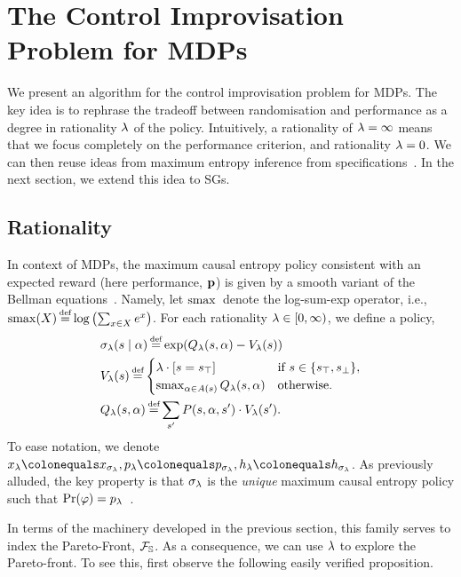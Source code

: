 
\section{The Control Improvisation Problem for MDPs}
\label{sec:mdps}

We present an algorithm for the control improvisation problem for
MDPs. The key idea is to rephrase the tradeoff between
randomisation and performance as a degree in rationality $\lambda$ of the
policy. Intuitively, a rationality of $\lambda = \infty$ means that we
focus completely on the performance criterion, and rationality $\lambda =
0$. We can then reuse ideas from maximum entropy inference from
specifications~\cite{DBLP:conf/cav/Vazquez-Chanlatte20}.  In the next
section, we extend this idea to SGs.

\subsection{Rationality}

\noindent
In context of MDPs, the maximum causal entropy policy consistent with
an expected reward (here performance, $\mathbf{p}$) is given by a
smooth variant of the Bellman equations~\cite{mceThesis}. Namely, let
$\operatorname*{\mathrm{smax}}{}$ denote the log-sum-exp operator, i.e., $\smoothmax(X)
\eqdef \log \left( \sum_{x\in X} e^x \right)$. For each rationality
$\lambda \in [0, \infty)$, we define a policy,
 \begin{align}
   &\sched_\rat(s\mid \act) \eqdef \exp( Q_\rat(s,\act) - V_\rat(s))  \\
   & V_\rat(s) \eqdef  \begin{cases}
     \lambda  \cdot \indicator{s = \target} & \text{if }s \in \{ \target, \sink \},\\
     \smoothmax_{\act \in \EnAct(s)}{  Q_\rat(s,\act) } & \text{otherwise.}
   \end{cases}\\ 
	& Q_\rat(s, \act) \eqdef \sum_{s'} P(s,\act,s') \cdot V_\rat(s').
 \end{align}
To ease notation, we denote $x_\rat \colonequals x_{\sched_\rat},
\scp_\rat \colonequals \scp_{\sched_\rat}, \rndp_\rat \colonequals
\rndp_{\sched_\rat}$. As previously alluded, the key property
is that $\sigma_\lambda$ is the \emph{unique} maximum causal entropy policy
such that $\Pr(\varphi) = p_\lambda$~\cite{DBLP:conf/cav/Vazquez-Chanlatte20}.

In terms of the machinery developed in the previous section, this
family serves to index the Pareto-Front, $\mathcal{F}_{\mathbb{S}}$.  As a
consequence, we can use $\lambda$ to explore the Pareto-front.  To see
this, first observe the following easily verified proposition.

